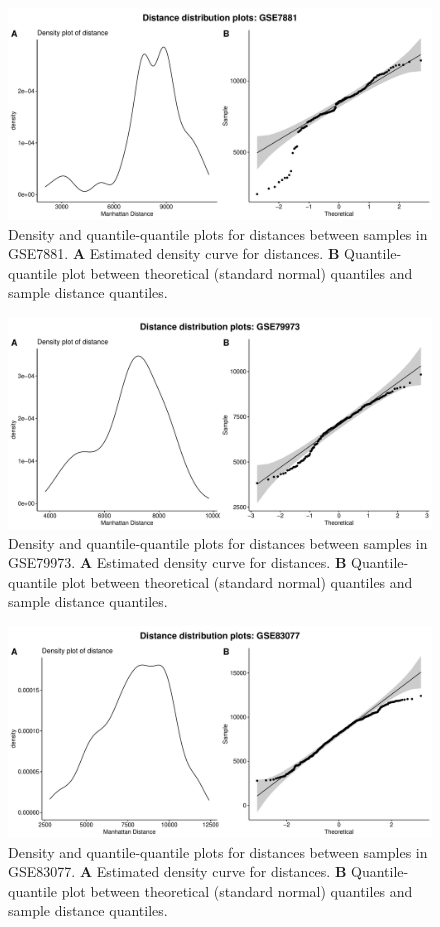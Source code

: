 \documentclass[10pt,letterpaper]{article}\usepackage[]{graphicx}\usepackage[]{color}
\begin{document}
\begin{figure}[H]
	\includegraphics[width=\textwidth]{manhattan-distance_hist_GSE7881.pdf}
	\caption{Density and quantile-quantile plots for distances between samples in GSE7881. \textbf{A} Estimated density curve for distances. \textbf{B} Quantile-quantile plot between theoretical (standard normal) quantiles and sample distance quantiles.}
\end{figure}

\begin{figure}[H]
	\includegraphics[width=\textwidth]{manhattan-distance_hist_GSE79973.pdf}
	\caption{Density and quantile-quantile plots for distances between samples in GSE79973. \textbf{A} Estimated density curve for distances. \textbf{B} Quantile-quantile plot between theoretical (standard normal) quantiles and sample distance quantiles.}
\end{figure}

\begin{figure}[H]
	\includegraphics[width=\textwidth]{manhattan-distance_hist_GSE83077.pdf}
	\caption{Density and quantile-quantile plots for distances between samples in GSE83077. \textbf{A} Estimated density curve for distances. \textbf{B} Quantile-quantile plot between theoretical (standard normal) quantiles and sample distance quantiles.}
\end{figure}
\end{document}

